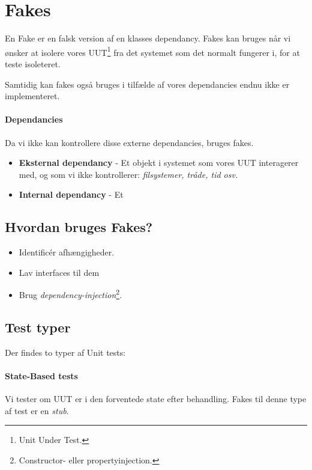 \section{Fakes}

En Fake er en falsk version af en klasses dependancy. Fakes kan bruges når vi ønsker at isolere vores UUT\footnote{Unit Under Test.} fra det systemet som det normalt fungerer i, for at teste isoleteret.

Samtidig kan fakes også bruges i tilfælde af vores dependancies endnu ikke er implementeret.

\paragraph{Dependancies} Da vi ikke kan kontrollere disse externe dependancies, bruges fakes.

\begin{itemize}
	\item \textbf{Eksternal dependancy} - Et objekt i systemet som vores UUT interagerer med, og som vi ikke kontrollerer: \textit{filsystemer, tråde, tid osv.}
	\item \textbf{Internal dependancy} - Et 
\end{itemize}

\subsection{Hvordan bruges Fakes?}

\begin{itemize}
	\item Identificér afhængigheder.
	\item Lav interfaces til dem
	\item Brug \textit{dependency-injection}\footnote{Constructor- eller propertyinjection.}.
\end{itemize}

\subsection{Test typer}
Der findes to typer af Unit tests:

\paragraph{State-Based tests} Vi tester om UUT er i den forventede state efter behandling. Fakes til denne type af test er en \textit{stub}. \\

